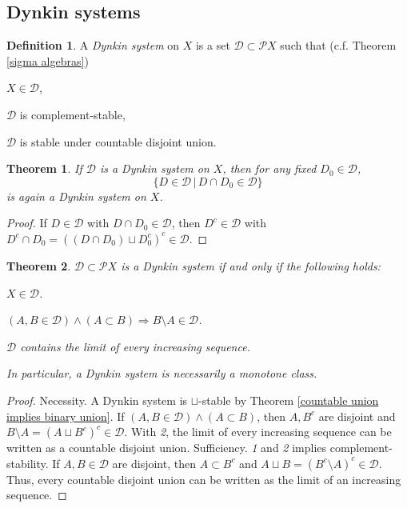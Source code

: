 \documentclass[11pt, a4paper, openany]{book}
\newtheorem{thm}{Theorem}\newtheorem{lem}{Lemma}\newtheorem{crl}{Corollary}
\theoremstyle{definition}
\newtheorem{define}{Definition}\newtheorem{exam}{Example}\newtheorem{remark}{Remark}
\newenvironment{tight_enumerate}{\begin{enumerate}\itemsep -0.2em}{\end{enumerate}}
\begin{document}
\subsection{Dynkin systems}
    \begin{define}\label{definition of Dynkin system}
         A \textit{Dynkin system} on $X$ is a set $\mathscr{D}\subset\mathscr{P}X$ such that (c.f. Theorem \ref{sigma algebras})
         \begin{tight_enumerate}
             \item $X\in\mathscr{D}$,
             \item $\mathscr{D}$ is complement-stable,
             \item $\mathscr{D}$ is stable under countable disjoint union.
         \end{tight_enumerate}
    \end{define}
    \begin{thm}
        If $\mathscr{D}$ is a Dynkin system on $X$, then for any fixed $D_0\in \mathscr{D}$,
        \[
            \{D\in\mathscr{D}\,|\,D\cap D_0\in\mathscr{D}\}
        \]
        is again a Dynkin system on $X$.
    \end{thm}
    \begin{proof}
        If $D\in\mathscr{D}$ with $D\cap D_0\in\mathscr{D}$, then $D^c\in \mathscr{D}$ with $D^c\cap D_0=((D\cap D_0)\sqcup D_0^c)^c\in\mathscr{D}$.
    \end{proof}
    \begin{thm}\label{characterization of Dynkin systems via monotone classes}
        $\mathscr{D}\subset\mathscr{P}X$ is a Dynkin system if and only if the following holds:
        \begin{tight_enumerate}
            \item $X\in \mathscr{D}$.
            \item $(A,B\in\mathscr{D})\wedge (A\subset B)\Rightarrow B\setminus A\in\mathscr{D}$.
            \item $\mathscr{D}$ contains the limit of every increasing sequence.
        \end{tight_enumerate}
        In particular, a Dynkin system is necessarily a monotone class.
    \end{thm}
    \begin{proof}
        Necessity. A Dynkin system is $\sqcup$-stable by Theorem \ref{countable union implies binary union}. If $(A,B\in\mathscr{D})\wedge (A\subset B)$, then $A,B^c$ are disjoint and $B\setminus A=(A\sqcup B^c)^c\in\mathscr{D}$. With \textit{2}, the limit of every increasing sequence can be written as a countable disjoint union. Sufficiency. \textit{1} and \textit{2} implies complement-stability. If $A,B\in\mathscr{D}$ are disjoint, then $A\subset B^c$ and $A\sqcup B=(B^c\setminus A)^c\in\mathscr{D}$. Thus, every countable disjoint union can be written as the limit of an increasing sequence.
    \end{proof}
\end{document}
